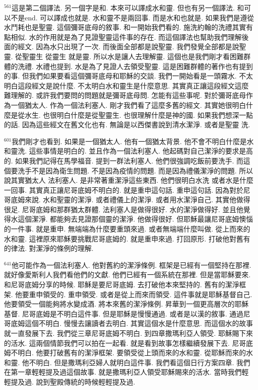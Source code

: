\documentclass{book}
\begin{document}
$^{561}$這是第二個譯法.
另一個字是和.
本來可以譯成水和靈.
但也有另一個譯法.
和可以不是end.
可以譯成也就是.
水和靈不是兩回事.
而是水和也就是.
如果我們是遵從水鬥耗也是聖靈.
這個彌哥底母的敘事.
和一開始我們看的.
施洗約翰的洗禮其實有點相似.
水的作用就是為了見證聖靈這件事的存在.
而這個譯法也幫助我們理解後面的經文.
因為水只出現了一次.
而後面全部都是說聖靈.
我們發覺全部都是說聖靈.
從聖靈生 從靈生 就是靈.
所以水是讓人去理解靈.
這個也是我們剛才看困難群體的洗禮.
水禮也提到.
水是為了見證人去領受聖靈.
這是困難群體的著作也有提到的事.
但我們如果要看這個彌哥底母和耶穌的交談.
我們一開始看是一頭霧水.
不太明白這段經文是說什麼.
不太明白水和靈生是什麼意思.
其實真正讓這段經文這麼難理解的.
或許我們要問的問題就是彌哥底母問.
怎能有這些事呢.
對於彌哥底母作為一個猶太人.
作為一個法利塞人.
剛才我們看了這麼多舊的經文.
其實她很明白什麼是從水生.
也很明白什麼是從聖靈生.
也很理解什麼是神的國.
如果我們想深一點的話.
因為這些經文在舊文化也有.
無論是以西傑書說到清水潔淨.
或者是聖靈 洗.

$^{601}$我們剛才也看到.
如果是一個猶太人.
他有一個猶太背景.
他不會不明白什麼是水和靈洗.
這些事情是明白的.
並且作為一個法利塞人.
他起碼對自己潔淨的要求是高的.
如果我們記得在馬學福音.
提到一群法利塞人.
他們很強調吃飯前要洗手.
而這個要洗手不是因為衛生問題.
不是因為疫情的問題.
而是因為禮儀潔淨的問題.
所以說其實猶太人 法利塞人.
是非常著重潔淨這些東西.
他們很明白水洗 或者水是什麼一回事.
其實真正讓尼哥底姆不明白的.
就是重申這句話.
重申這句話.
因為對於尼哥底姆來說.
水和聖靈的潔淨.
或者禮儀上的潔淨.
或者用水潔淨自己.
其實他做得很足.
尼哥底姆和那群猶太群體.
法利塞人是做得很好.
水的潔淨做得好.
並且他覺得水這個潔淨.
都能夠去見證那個靈的潔淨.
他做得很好.
但耶穌最讓尼哥底姆懊惱的一件事.
就是重申.
無端端為什麼要重頭來過.
或者無端端什麼叫做.
從上而來的水和靈.
這裡原來耶穌要挑戰尼哥底姆的.
就是重申來過.
打回原形.
打破他對舊有的律法.
對潔淨的條例的理解.

$^{641}$他可能作為一個法利塞人.
他對舊約的潔淨條例.
框架是已經有一個堅持在那裡.
就好像愛斯利人我們看他們的文獻.
他們已經有一個系統在那裡.
但是當耶穌要來.
和尼哥底姆分享的時候.
耶穌是要尼哥底姆.
去打破他本來堅持的.
舊有的潔淨框架.
他要重申領受的.
重申領受.
或者是從上而來而領受.
這件事就是耶穌基督自己.
他要領受一個能夠將水變成酒.
將本來舊的潔淨條例.
昇華到一個更高層次的耶穌基督.
尼哥底姆是不明白這件事.
但是耶穌是慢慢通過.
或者是以漢的敘事.
通過尼哥底姆這個不明白.
慢慢去讓讀者去明白.
其實這個水是什麼意思.
而這個水的故事就一直發展下去.
我們從三章尼哥底姆不明白.
到四章撒瑪利亞人領受.
耶穌賜下來的活水.
這兩個情節我們可以拍在一起看.
就是看到故事怎樣繼續發展下去.
尼哥底姆不明白.
他要打破舊有的潔淨框架.
要領受從上頭而來的水和靈.
從耶穌而來的水和靈.
他不明白.
但是撒瑪利亞婦人就明白這件事.
我們看這個日行方案四章.
我們在第一章輕輕提及過這個故事.
就是撒瑪利亞人領受耶穌賜來的活水.
當時我們輕輕提及過.
說到聖殿傳統的時候輕輕提及過.
\end{document}
